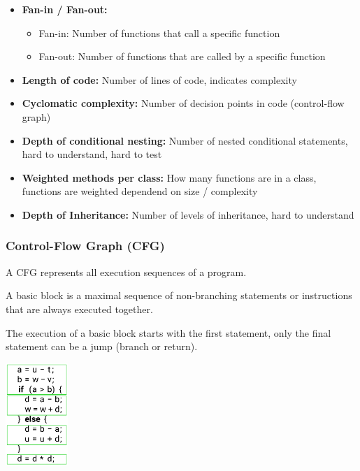 \documentclass[
../../Software_Engineering_Summary.tex,
]
{subfiles}
\begin{document}
\begin{defbox}
    \begin{itemize}
        \item \textbf{Fan-in / Fan-out:} 
        \begin{itemize}
            \item Fan-in: Number of functions that call a specific function
            \item Fan-out: Number of functions that are called by a specific function
        \end{itemize}
        \item \textbf{Length of code:} Number of lines of code, indicates complexity
        \item \textbf{Cyclomatic complexity:} Number of decision points in code (control-flow graph)
        \item \textbf{Depth of conditional nesting:} Number of nested conditional statements, hard to understand, hard to test
        \item \textbf{Weighted methods per class:} How many functions are in a class, functions are weighted dependend on size / complexity
        \item \textbf{Depth of Inheritance:} Number of levels of inheritance, hard to understand
    \end{itemize}
\end{defbox}

\subsubsection{Control-Flow Graph (CFG)}
A CFG represents all execution sequences of a program.

\begin{defbox}
    A basic block is a maximal sequence of non-branching statements or instructions that are always executed together.

    The execution of a basic block starts with the first statement, only the final statement can be a jump (branch or return).

    \begin{center}
        \includegraphics[height=110pt]{Pics/06/BasicBlocksCFG.png}
    \end{center}
\end{defbox}
\end{document}

